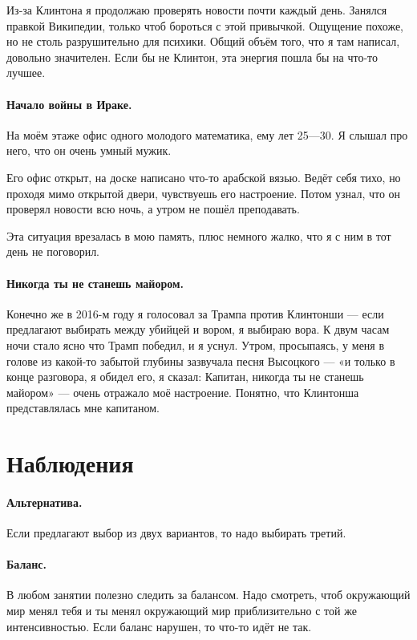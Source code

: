 \documentclass{book}
\begin{document}
Из-за Клинтона я продолжаю проверять новости почти каждый день.
Занялся правкой Википедии, только чтоб бороться с этой привычкой.
Ощущение похоже, но не столь разрушительно для психики.
Общий объём того, что я там написал, довольно значителен.
Если бы не Клинтон, эта энергия пошла бы на что-то лучшее.

\paragraph{Начало войны в Ираке.}
На моём этаже офис одного молодого математика, ему лет 25---30.
Я слышал про него, что он очень умный мужик.

Его офис открыт, на доске написано что-то арабской вязью.
Ведёт себя тихо, но проходя мимо открытой двери, чувствуешь его настроение.
Потом узнал, что он проверял новости всю ночь,
а утром не пошёл преподавать.

Эта ситуация врезалась в мою память, плюс немного жалко, что я с ним в тот день не поговорил.

\paragraph{Никогда ты не станешь майором.}
Конечно же в 2016-м году я голосовал за Трампа против Клинтонши --- если предлагают выбирать между убийцей и вором, я выбираю вора.
К двум часам ночи стало ясно что Трамп победил, и я уснул.
Утром, просыпаясь, у меня в голове из какой-то забытой глубины зазвучала песня Высоцкого --- «и только в конце разговора, я обидел его, я сказал: Капитан, никогда ты не станешь майором» --- очень отражало моё настроение.
Понятно, что Клинтонша представлялась мне капитаном.

\section*{Наблюдения}

\paragraph{Альтернатива.}
Если предлагают выбор из двух вариантов, то надо выбирать третий.

\paragraph{Баланс.} В любом занятии полезно следить за балансом.
Надо смотреть, чтоб окружающий мир менял тебя и ты менял окружающий мир приблизительно с той же интенсивностью.
Если баланс нарушен, то что-то идёт не так.
\end{document}
